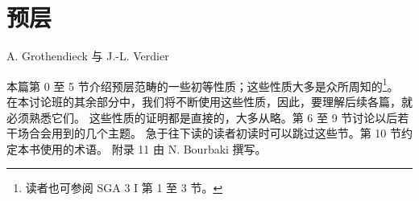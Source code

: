 \chapter{预层}
\begin{center}
A. Grothendieck 与 J.-L. Verdier
\end{center}
\label{sga4.exp.I}

本篇\pageoriginale 第 0 至 5 节介绍预层范畴的一些初等性质；这些性质大多是众所周知的\footnote[1]{读者也可参阅 SGA 3 I 第 1 至 3 节。}。
在本讨论班的其余部分中，我们将不断使用这些性质，因此，要理解后续各篇，就必须熟悉它们。
这些性质的证明都是直接的，大多从略。第 6 至 9 节讨论以后若干场合会用到的几个主题。
急于往下读的读者初读时可以跳过这些节。第 10 节约定本书使用的术语。
附录 11 由 N. Bourbaki 撰写。

\setcounter{section}{-1}







